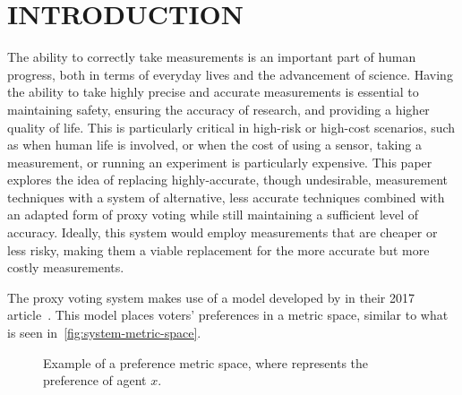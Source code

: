 %
%

\chapter{INTRODUCTION}\label{ch:introduction}
\thispagestyle{empty}

The ability to correctly take measurements is an important part of human
progress, both in terms of everyday lives and the advancement of science.
Having the ability to take highly precise and accurate measurements is essential
to maintaining safety, ensuring the accuracy of research, and providing a
higher quality of life.
This is particularly critical in high-risk or high-cost scenarios, such as when
human life is involved, or when the cost of using a sensor, taking a
measurement, or running an experiment is particularly expensive.
This paper explores the idea of replacing highly-accurate, though undesirable,
measurement techniques with a system of alternative, less accurate techniques combined
with an adapted form of proxy voting while still maintaining a sufficient level of
accuracy.
Ideally, this system would employ measurements that are cheaper or less risky, making
them a viable replacement for the more accurate but more costly measurements.

The proxy voting system makes use of a model developed by  in their 2017
article~\cite{Cohensius2017}.
This model places voters' preferences in a metric space, similar to what is seen
in~\autoref{fig:system-metric-space}.


\begin{figure}[!htbp]
    \centering

    \caption{Example of a preference metric space, where  represents the
    preference of agent $x$.}
    \label{fig:system-metric-space}
\end{figure}




